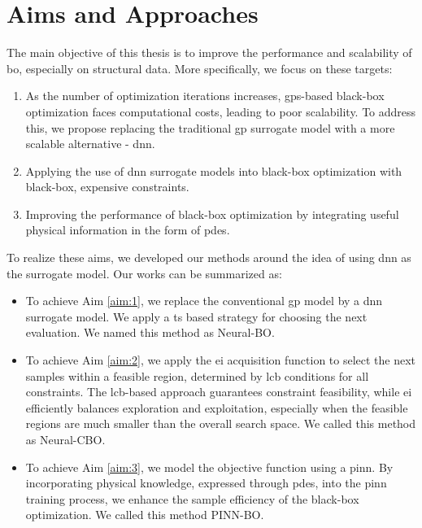 \section{Aims and Approaches}
The main objective of this thesis is to improve the performance and scalability of \acl{bo}, especially on structural data.  More specifically, we focus on these targets:
\begin{enumerate}
    \item  As the number of optimization iterations increases, \acp{gp}-based black-box optimization faces computational costs, leading to poor scalability.
    To address this, we propose replacing the traditional \ac{gp} surrogate model with a more scalable alternative - \ac{dnn}. \label{aim:1}
    \item Applying the use of \ac{dnn} surrogate models into black-box optimization with black-box, expensive constraints.  \label{aim:2}
    \item Improving the performance of black-box optimization by integrating useful physical information in the form of \acp{pde}. \label{aim:3}
\end{enumerate}
To realize these aims, we developed our methods around the idea of using \ac{dnn} as the surrogate model. Our works can be summarized as:
\begin{itemize}
    \item To achieve Aim \ref{aim:1}, we replace the conventional \ac{gp} model by a \ac{dnn} surrogate model. We apply a \acl{ts} based strategy for choosing the next evaluation. We named this method as Neural-BO.
    \item To achieve Aim \ref{aim:2}, we apply the \acf{ei} acquisition function to select the next samples within a feasible region, determined by \acf{lcb} conditions for all constraints. The \acs{lcb}-based approach guarantees constraint feasibility, while \acs{ei} efficiently balances exploration and exploitation, especially when the feasible regions are much smaller than the overall search space. We called this method as Neural-CBO.
    \item To achieve Aim \ref{aim:3}, we model the objective function using a \acf{pinn}. By incorporating physical knowledge, expressed through \acp{pde}, into the \ac{pinn} training process, we enhance the sample efficiency of the black-box optimization.  We called this method PINN-BO. 
\end{itemize}
